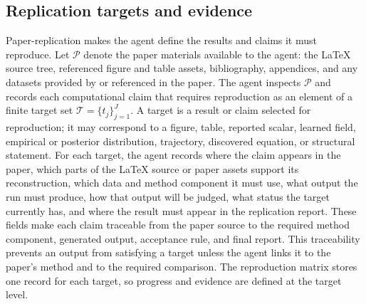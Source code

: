 \documentclass[authoryear,5p,times,nopreprintline]{elsarticle}
\begin{document}
\subsection{Replication targets and evidence}\label{sec:replication_problem}
Paper-replication makes the agent define the results and claims it must reproduce.
Let \(\mathcal{P}\) denote the paper materials available to the agent: the \LaTeX{} source tree, referenced figure and table assets, bibliography, appendices, and any datasets provided by or referenced in the paper.
The agent inspects \(\mathcal{P}\) and records each computational claim that requires reproduction as an element of a finite target set \(\mathcal{T}=\{t_j\}_{j=1}^{J}\).
A target is a result or claim selected for reproduction; it may correspond to a figure, table, reported scalar, learned field, empirical or posterior distribution, trajectory, discovered equation, or structural statement.
For each target, the agent records where the claim appears in the paper, which parts of the \LaTeX{} source or paper assets support its reconstruction, which data and method component it must use, what output the run must produce, how that output will be judged, what status the target currently has, and where the result must appear in the replication report.
These fields make each claim traceable from the paper source to the required method component, generated output, acceptance rule, and final report.
This traceability prevents an output from satisfying a target unless the agent links it to the paper's method and to the required comparison.
The reproduction matrix stores one record for each target, so progress and evidence are defined at the target level.
\end{document}
